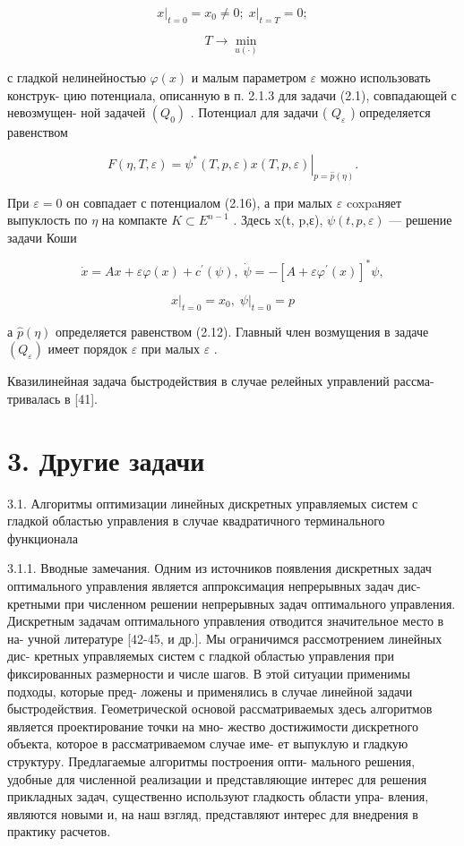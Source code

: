 \documentclass[10pt]{article}
\begin{document}
\[
{\left. x\right| }_{t = 0} = {x}_{0} \neq  0;{\left. \;x\right| }_{t = T} = 0;
\]

\[
T \rightarrow  \mathop{\min }\limits_{{u\left( \cdot \right) }}
\]

с гладкой нелинейностью \(\varphi \left( x\right)\) и малым параметром \(\varepsilon\) можно использовать конструк- цию потенциала, описанную в п. 2.1.3 для задачи (2.1), совпадающей с невозмущен- ной задачей \(\left( {Q}_{0}\right)\) . Потенциал для задачи ( \({Q}_{\varepsilon }\) ) определяется равенством

\[
F\left( {\eta ,T,\varepsilon }\right)  = {\left. {\psi }^{ * }\left( T,p,\varepsilon \right) x\left( T,p,\varepsilon \right) \right| }_{p = \widehat{p}\left( \eta \right) }.
\]

При \(\varepsilon  = 0\) он совпадает с потенциалом (2.16), а при малых \(\varepsilon\) coxpaняет выпуклость по \(\eta\) на компакте \(K \subset  {E}^{n - 1}\) . Здесь x(t, p,ε), \(\psi \left( {t,p,\varepsilon }\right)\) — решение задачи Коши

\[
\dot{x} = {Ax} + {\varepsilon \varphi }\left( x\right)  + {c}^{\prime }\left( \psi \right) ,\;\dot{\psi } =  - {\left[  A + \varepsilon {\varphi }^{\prime }\left( x\right) \right]  }^{ * }\psi ,
\]

\[
{\left. x\right| }_{t = 0} = {x}_{0},{\left. \;\psi \right| }_{t = 0} = p
\]

а \(\widehat{p}\left( \eta \right)\) определяется равенством (2.12). Главный член возмущения в задаче \(\left( {Q}_{\varepsilon }\right)\) имеет порядок \(\varepsilon\) при малых \(\varepsilon\) .

Квазилинейная задача быстродействия в случае релейных управлений рассма- тривалась в [41].

\section*{3. Другие задачи}

3.1. Алгоритмы оптимизации линейных дискретных управляемых систем с гладкой областью управления в случае квадратичного терминального функционала

3.1.1. Вводные замечания. Одним из источников появления дискретных задач оптимального управления является аппроксимация непрерывных задач дис- кретными при численном решении непрерывных задач оптимального управления. Дискретным задачам оптимального управления отводится значительное место в на- учной литературе [42-45, и др.]. Мы ограничимся рассмотрением линейных дис- кретных управляемых систем с гладкой областью управления при фиксированных размерности и числе шагов. В этой ситуации применимы подходы, которые пред- ложены и применялись в случае линейной задачи быстродействия. Геометрической основой рассматриваемых здесь алгоритмов является проектирование точки на мно- жество достижимости дискретного объекта, которое в рассматриваемом случае име- ет выпуклую и гладкую структуру. Предлагаемые алгоритмы построения опти- мального решения, удобные для численной реализации и представляющие интерес для решения прикладных задач, существенно используют гладкость области упра- вления, являются новыми и, на наш взгляд, представляют интерес для внедрения в практику расчетов.
\end{document}
